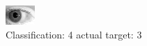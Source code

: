 \begin{figure}[h!]
\begin{center}
\includegraphics[width=0.60\columnwidth]{figures/ID319_class_4_target_3.png}
\end{center}
\caption{ Classification: 4 actual target: 3}
\label{fig:ID319_class_4_target_3}
\end{figure}

